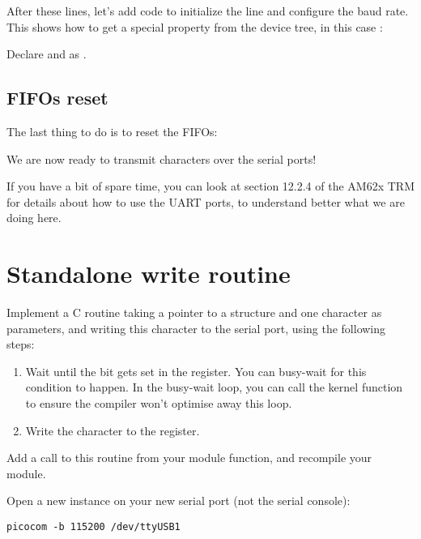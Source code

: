 After these lines, let's add code to initialize the line
and configure the baud rate. This shows how to get a special
property from the device tree, in this case :


Declare  and  as .

\subsection{FIFOs reset}

The last thing to do is to reset the FIFOs:


We are now ready to transmit characters over the serial ports!

If you have a bit of spare time, you can look at section 12.2.4 of the
AM62x TRM for details about how to use the UART ports, to understand
better what we are doing here.

\section{Standalone write routine}

Implement a C routine taking a pointer to a 
structure and one character as parameters, and writing
this character to the serial port, using the following steps:

\begin{enumerate}
\item Wait until the  bit gets set in the
   register.  You can busy-wait for this condition to happen.
  In the busy-wait loop, you can call the  kernel function
  to ensure the compiler won't optimise away this loop.
\item Write the character to the  register.
\end{enumerate}

Add a call to this routine from your module  function,
and recompile your module.

Open a new  instance on your new serial port (not the
serial console):

\begin{verbatim}
picocom -b 115200 /dev/ttyUSB1
\end{verbatim}

